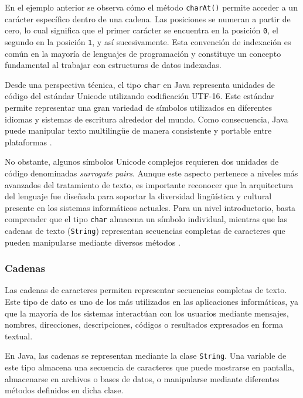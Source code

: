 \documentclass[12pt,twoside]{book}
\begin{document}
						\noindent
						En el ejemplo anterior se observa cómo el método \texttt{charAt()} permite acceder a un carácter específico dentro de una cadena. Las posiciones se numeran a partir de cero, lo cual significa que el primer carácter se encuentra en la posición \texttt{0}, el segundo en la posición \texttt{1}, y así sucesivamente. Esta convención de indexación es común en la mayoría de lenguajes de programación y constituye un concepto fundamental al trabajar con estructuras de datos indexadas.
						
						Desde una perspectiva técnica, el tipo \texttt{char} en Java representa unidades de código del estándar Unicode utilizando codificación UTF-16. Este estándar permite representar una gran variedad de símbolos utilizados en diferentes idiomas y sistemas de escritura alrededor del mundo. Como consecuencia, Java puede manipular texto multilingüe de manera consistente y portable entre plataformas \cite{Gosling2014JavaLanguageSpec}.
						
						No obstante, algunos símbolos Unicode complejos requieren dos unidades de código denominadas \textit{surrogate pairs}. Aunque este aspecto pertenece a niveles más avanzados del tratamiento de texto, es importante reconocer que la arquitectura del lenguaje fue diseñada para soportar la diversidad lingüística y cultural presente en los sistemas informáticos actuales. Para un nivel introductorio, basta comprender que el tipo \texttt{char} almacena un símbolo individual, mientras que las cadenas de texto (\texttt{String}) representan secuencias completas de caracteres que pueden manipularse mediante diversos métodos \cite{Bloch2018EffectiveJava}.

					\subsubsection{Cadenas}
						\noindent
						Las cadenas de caracteres permiten representar secuencias completas de texto. Este tipo de dato es uno de los más utilizados en las aplicaciones informáticas, ya que la mayoría de los sistemas interactúan con los usuarios mediante mensajes, nombres, direcciones, descripciones, códigos o resultados expresados en forma textual.
						
						En Java, las cadenas se representan mediante la clase \texttt{String}. Una variable de este tipo almacena una secuencia de caracteres que puede mostrarse en pantalla, almacenarse en archivos o bases de datos, o manipularse mediante diferentes métodos definidos en dicha clase.
						
\end{document}
